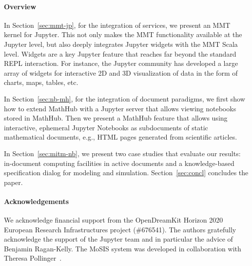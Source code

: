 \paragraph{Overview} In Section~\ref{sec:mmt-jp}, for the integration of services, we present an MMT kernel for Jupyter.
This not only makes the MMT functionality available at the Jupyter level, but also deeply integrates Jupyter widgets with the MMT Scala level.
Widgets are a key Jupyter feature that reaches far beyond the standard REPL interaction.
For instance, the Jupyter community has developed a large array of widgets for interactive 2D and 3D visualization of data in the form of charts, maps, tables, etc.

In Section~\ref{sec:nb-mh}, for the integration of document paradigms, we first show how to extend MathHub with a Jupyter server that allows viewing notebooks stored in MathHub.
Then we present a MathHub feature that allows using interactive, ephemeral Jupyter Notebooks as subdocuments of static mathematical documents, e.g., HTML pages generated from scientific articles.

In Section~\ref{sec:mitm-nb}, we present two case studies that evaluate our results: in-document computing facilities in active documents and a knowledge-based specification dialog for modeling and simulation.
Section~\ref{sec:concl} concludes the paper.

\paragraph{Acknowledgements}
We acknowledge financial support from the OpenDreamKit Horizon 2020 European Research Infrastructures project (\#676541).
The authors gratefully acknowledge the support of the Jupyter team and in particular the advice of Benjamin Ragan-Kelly.
The MoSIS system was developed in collaboration with Theresa Pollinger~\cite{PolKohKoe:kacse18}.

